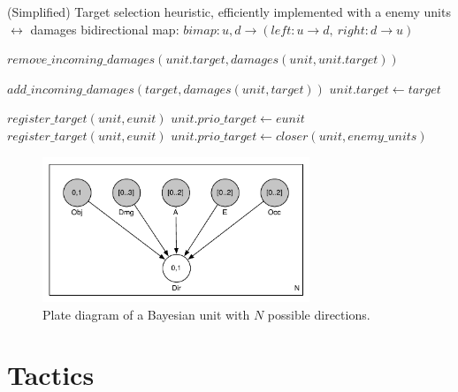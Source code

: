 \begin{algorithm}
\caption{(Simplified) Target selection heuristic, efficiently implemented with a enemy units $\leftrightarrow$ damages bidirectional map: $bimap : u, d \rightarrow (left : u \rightarrow d,\ right : d \rightarrow u)$}
\label{alg:targetselection}
\begin{algorithmic}
\State $remove\_incoming\_damages(unit.target, damages(unit,unit.target))$
\EndFunction

\State $add\_incoming\_damages(target, damages(unit, target))$
\State $unit.target \leftarrow target$
\EndFunction

            \State $register\_target(unit, eunit)$
            \State $unit.prio\_target \leftarrow eunit$
        \EndIf 
    \EndIf 
\EndFor
{}
            \State $register\_target(unit, eunit)$
        \EndIf 
    \EndFor
\EndIf
{} %
    $unit.prio\_target \leftarrow closer(unit, enemy\_units)$
\EndIf
\EndFunction
\end{algorithmic}
\end{algorithm}

\begin{figure}[!h]
\begin{center}
\includegraphics[width=8cm]{images/BayesianUnit_plate.pdf}
\caption{Plate diagram of a Bayesian unit with $N$ possible directions.}
\label{fig:BayesianUnit_plate}
\end{center}
\end{figure}

\clearpage
\section{Tactics}

